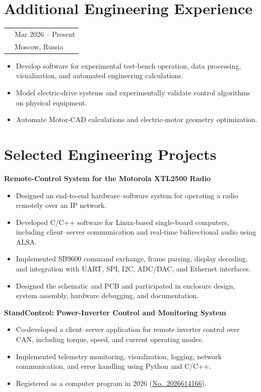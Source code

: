 \documentclass[10pt,a4paper]{article}
\makeatletter
\newcommand{\cvrole}[4]{%
  \begin{tabularx}{\textwidth}{@{}>{\raggedright\arraybackslash}X
    >{\raggedleft\arraybackslash}p{0.27\textwidth}@{}}
    {\sffamily\bfseries #1} & {\small\color{textgray}#4} \\
    {\itshape #2} & {\small\color{lightgray}#3}
  \end{tabularx}
  \vspace{0.12em}
}
\newcommand{\project}[2]{%
  \needspace{3\baselineskip}
  {\sffamily\bfseries #1}\par
  \vspace{0.12em}
  #2
}
\makeatother
\begin{document}
\newpage

\section{Additional Engineering Experience}

\cvrole{Moscow Institute of Physics and Technology}
       {Research Engineer, Robotics and Electric Drive Laboratory}
       {Moscow, Russia}{Mar 2026 -- Present}
\begin{itemize}
  \item Develop software for experimental test-bench operation, data
        processing, visualization, and automated engineering calculations.
  \item Model electric-drive systems and experimentally validate control
        algorithms on physical equipment.
  \item Automate Motor-CAD calculations and electric-motor geometry optimization.
\end{itemize}

\section{Selected Engineering Projects}

\project{Remote-Control System for the Motorola XTL2500 Radio}{
  \begin{itemize}
    \item Designed an end-to-end hardware--software system for operating a radio
          remotely over an IP network.
    \item Developed C/C++ software for Linux-based single-board computers,
          including client--server communication and real-time bidirectional
          audio using ALSA.
    \item Implemented SB9600 command exchange, frame parsing, display decoding,
          and integration with UART, SPI, I2C, ADC/DAC, and Ethernet interfaces.
    \item Designed the schematic and PCB and participated in enclosure design,
          system assembly, hardware debugging, and documentation.
  \end{itemize}
}

\vspace{0.25em}
\project{StandControl: Power-Inverter Control and Monitoring System}{
  \begin{itemize}
    \item Co-developed a client--server application for remote inverter control
          over CAN, including torque, speed, and current operating modes.
    \item Implemented telemetry monitoring, visualization, logging, network
          communication, and error handling using Python and C/C++.
    \item Registered as a computer program in 2026
          (\href{https://new.fips.ru/registers-doc-view/fips_servlet?DB=EVM\&DocNumber=2026614166\&TypeFile=html}{No.~2026614166}).
  \end{itemize}
}
\end{document}
